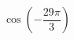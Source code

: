 \begin{ex}[type=calculate]
	\begin{condition}
		\( \cos\left(- \dfrac{29\pi}{3} \right) \)
	\end{condition}
\end{ex}